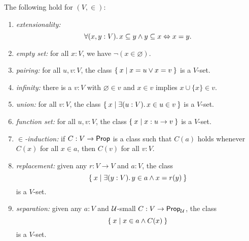 \begin{thm}\label{thm:VisCST}
  The following hold for $(V, {\in})$:
  \begin{enumerate}
  \item \emph{extensionality:}
    \begin{equation*}
      \fall{x, y : V} x \subseteq y \land y \subseteq x \Leftrightarrow x = y.
    \end{equation*}
     \item \emph{empty set:} for all $x:V$, we have $\neg (x\in \varnothing)$.
    \item \emph{pairing:} for all $u, v:V$, the class $\Set{ x | x = u \vee x = v}$ is a $V$-set.
    \item \emph{infinity:} there is a $v:V$ with $\varnothing\in v$ and $x\in v$ implies $x\cup \{x\}\in v$.
  \item \emph{union:} for all $v:V$, the class $\setof{ x | \exis{u:V} x \in u \in v}$ is a $V$-set.
    \item \emph{function set:} for all $u, v:V$, the class $\Set{ x | x : u\to v}$ is a $V$-set.
   \item \emph{$\in$-induction:} if $C : V \to \mathsf{Prop}$ is a class such that $C(a)$ holds whenever $C(x)$ for all $x\in a$, then $C(v)$ for all $v:V$.
     \item \emph{replacement:} given any $r : V \to V$ and $a : V$, the class 
       \begin{equation*}
         \setof{ x | \exis{y : V} y \in a \land x = r(y)}
       \end{equation*}
       is a $V$-set.
   \item \emph{separation:} given any $a : V$ and $\mathcal{U}$-small $C : V \to \mathsf{Prop}_\mathcal{U}$, the class
     \begin{equation*}
       \Set{ x | x \in a \land C(x)}
     \end{equation*}
     is a $V$-set.
  \end{enumerate}
\end{thm}


